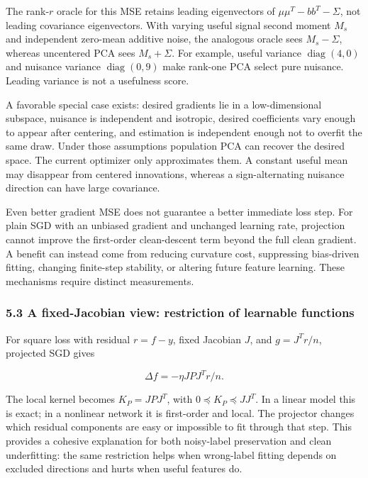 \documentclass[
  british,
  10pt,
  a4paper,
]{article}
\begin{document}
The rank-\(r\) oracle for this MSE retains leading eigenvectors of
\(\mu\mu^T-bb^T-\Sigma\), not leading covariance
eigenvectors\allowbreak{}.\allowbreak{} With varying useful signal
second moment \(M_s\) and independent zero-mean additive noise, the
analogous oracle sees \(M_s-\Sigma\), whereas uncentered PCA sees
\(M_s+\Sigma\). For example, useful variance
\(\operatorname{diag}(4,0)\) and nuisance variance
\(\operatorname{diag}(0,9)\) make rank-one PCA select pure nuisance.
Leading variance is not a usefulness score.

A favorable special case exists: desired gradients lie in a
low-\allowbreak{}dimensional subspace, nuisance is independent and
isotropic, desired coefficients vary enough to appear after centering,
and estimation is independent enough not to overfit the same draw. Under
those assumptions population PCA can recover the desired space. The
current optimizer only approximates them. A constant useful mean may
disappear from centered innovations,\allowbreak{} whereas a
sign-\allowbreak{}alternating nuisance direction can have large
covariance.\allowbreak{}

Even better gradient MSE does not guarantee a better immediate loss
step. For plain SGD with an unbiased gradient and unchanged learning
rate, projection cannot improve the first-\allowbreak{}order
clean-\allowbreak{}descent term beyond the full clean gradient. A
benefit can instead come from reducing curvature cost, suppressing
bias-\allowbreak{}driven fitting, changing finite-\allowbreak{}step
stability, or altering future feature learning. These mechanisms require
distinct measurements\allowbreak{}.\allowbreak{}

\subsubsection{\texorpdfstring{5.3 A fixed-\allowbreak{}Jacobian view:
restriction of learnable
functions}{5.3 A  view: restriction of learnable functions}}\label{synthesis--a-fixed-jacobian-view-restriction-of-learnable-functions}

For square loss with residual \(r=f-y\), fixed Jacobian \(J\), and
\(g=J^Tr/n\), projected SGD gives

\[
\Delta f=-\eta JPJ^Tr/n.
\]

The local kernel becomes \(K_P=JPJ^T\), with
\(0\preceq K_P\preceq JJ^T\). In a linear model this is exact; in a
nonlinear network it is first-\allowbreak{}order and local. The
projector changes which residual components are easy or impossible to
fit through that step. This provides a cohesive explanation for both
noisy-\allowbreak{}label preservation and clean underfitting: the same
restriction helps when wrong-\allowbreak{}label fitting depends on
excluded directions and hurts when useful features do.
\end{document}
